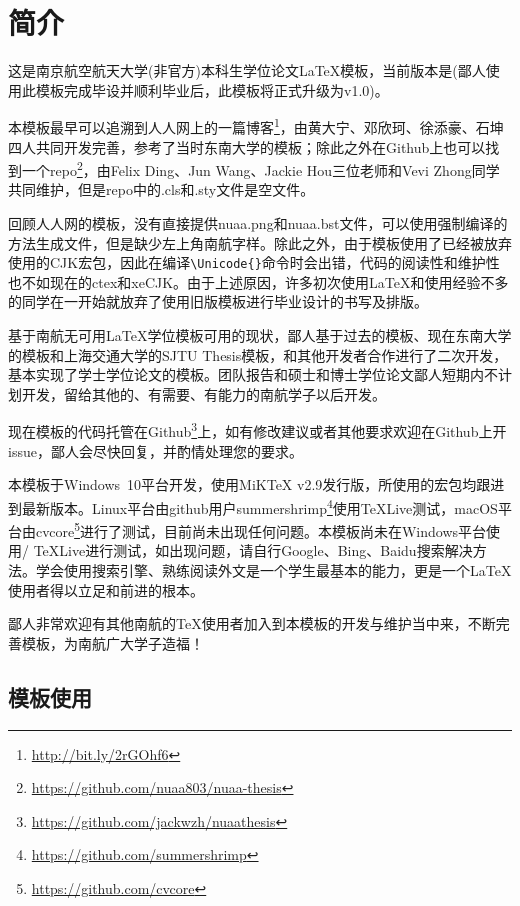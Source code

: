 \chapter{简介}\label{chap:intro}

这是南京航空航天大学(非官方)本科生学位论文\LaTeX 模板，当前版本是\version(鄙人使用此模板完成毕设并顺利毕业后，此模板将正式升级为v1.0)。

本模板最早可以追溯到人人网上的一篇博客\footnote{\url{http://bit.ly/2rGOhf6}}，由黄大宁、邓欣珂、徐添豪、石坤四人共同开发完善，参考了当时东南大学的\seuthesix 模板；除此之外在Github上也可以找到一个repo\footnote{\url{https://github.com/nuaa803/nuaa-thesis}}，由Felix Ding、Jun Wang、Jackie Hou三位老师和Vevi Zhong同学共同维护，但是repo中的.cls和.sty文件是空文件。

回顾人人网的模板，没有直接提供nuaa.png和nuaa.bst文件，可以使用强制编译的方法生成文件，但是缺少左上角南航字样。除此之外，由于模板使用了已经被放弃使用的CJK宏包，因此在编译\verb+\Unicode{}+命令时会出错，代码的阅读性和维护性也不如现在的ctex和xeCJK。由于上述原因，许多初次使用\LaTeX 和使用经验不多的同学在一开始就放弃了使用旧版模板进行毕业设计的书写及排版。

基于南航无可用\LaTeX 学位模板可用的现状，鄙人基于过去的\oldnuaathesis 模板、现在东南大学的\seuthesix 模板和上海交通大学的SJTU Thesis模板，和其他开发者合作进行了二次开发，基本实现了学士学位论文的模板。团队报告和硕士和博士学位论文鄙人短期内不计划开发，留给其他的、有需要、有能力的南航学子以后开发。

现在\nuaathesis 模板的代码托管在Github\footnote{\url{https://github.com/jackwzh/nuaathesis}}上，如有修改建议或者其他要求欢迎在Github上开issue，鄙人会尽快回复，并酌情处理您的要求。

本模板于Windows~10平台开发，使用MiKTeX v2.9发行版，所使用的宏包均跟进到最新版本。Linux平台由github用户summershrimp\footnote{\url{https://github.com/summershrimp}}使用\TeX Live测试，macOS平台由cvcore\footnote{\url{https://github.com/cvcore}}进行了测试，目前尚未出现任何问题。本模板尚未在Windows平台使用\CTeX / \TeX Live进行测试，如出现问题，请自行Google、Bing、Baidu搜索解决方法。学会使用搜索引擎、熟练阅读外文是一个学生最基本的能力，更是一个\LaTeX 使用者得以立足和前进的根本。

鄙人非常欢迎有其他南航的\TeX 使用者加入到本模板的开发与维护当中来，不断完善模板，为南航广大学子造福！

\section{模板使用}
